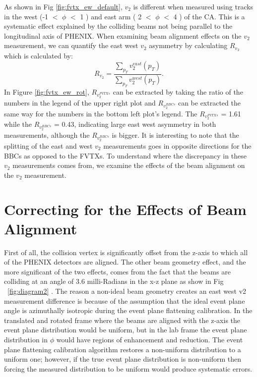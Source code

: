 As shown in Fig \ref{fig:fvtx_ew_default}, $v_2$ is different when measured using tracks in the west (-1 $<$ $\phi$ $<$ 1 ) and east arm ( 2 $<$ $\phi$ $<$ 4 ) of the CA. This is a systematic effect explained by the colliding beams not being parallel to the longitudinal axis of PHENIX. When examining beam alignment effects on the $v_2$ measurement, we can quantify the east west $v_2$ asymmetry by calculating $R_{v_2}$ which is calculated by: 
\begin{equation}
R_{v_2} = \frac{\sum_{p_T}{v_2^{east}(p_T)}}{\sum_{p_T}{v_2^{west}(p_T)}}.
\end{equation}
In Figure \ref{fig:fvtx_ew_rot}, $R_{v_2^{FVTXs}}$ can be extracted by taking the ratio of the numbers in the legend of the upper right plot and $R_{v_2^{BBCs}}$ can be extracted the same way for the numbers in the bottom left plot's legend. The $R_{v_2^{FVTXs}}$ = 1.61 while the $R_{v_2^{BBCs}}$ = 0.43, indicating large east west asymmetry in both measurements, although the $R_{v_2^{BBCs}}$ is bigger. It is interesting to note that the splitting of the east and west $v_2$ measurements goes in opposite directions for the BBCs as opposed to the FVTXs. To understand where the discrepancy in these $v_2$ measurements comes from, we examine the effects of the beam alignment on the $v_2$ measurement.
\section{Correcting for the Effects of Beam Alignment}
 First of all, the collision vertex is significantly offset from the z-axis to which all of the PHENIX detectors are aligned. The other beam geometry effect, and the more significant of the two effects, comes from the fact that the beams are colliding at an angle of 3.6 milli-Radians in the x-z plane as show in Fig ~\ref{fig:diagram2} \cite{BNL_Run15_Operations}. The reason a non-ideal beam geometry creates an east west v2 measurement difference is because of the assumption that the ideal event plane angle is azimuthally isotropic during the event plane flattening calibration. In the translated and rotated frame where the beams are aligned with the z-axis the event plane distribution would be uniform, but in the lab frame the event plane distribution in $\phi$ would have regions of enhancement and reduction. The event plane flattening calibration algorithm restores a non-uniform distribution to a uniform one; however, if the true event plane distribution is non-uniform then forcing the measured distribution to be uniform would produce systematic errors.

